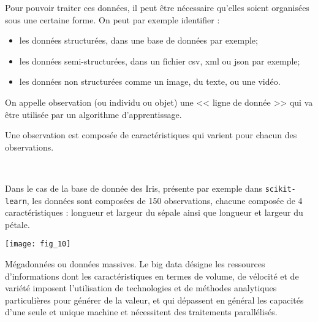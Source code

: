 Pour pouvoir traiter ces données, il peut être nécessaire qu'elles soient organisées sous une certaine forme. On peut par exemple identifier : 
\begin{itemize}
\item les données structurées, dans une base de données par exemple;
\item les données semi-structurées, dans un fichier csv, xml ou json par exemple;
\item les données non structurées comme un image, du texte, ou une vidéo.
\end{itemize}

\begin{defi}

On appelle observation (ou individu ou objet) une << ligne de donnée >> qui va être utilisée par un algorithme d'apprentissage. 

Une observation est composée de caractéristiques qui varient pour chacun des observations. 
\end{defi}

\begin{exemple}~\\

\begin{minipage}[c]{.65\linewidth}
Dans le cas de la base de donnée des Iris, présente par exemple dans \texttt{scikit-learn}, les données sont composées de 150 observations, chacune composée de 4 caractéristiques : longueur et largeur du sépale ainsi que longueur et largeur du pétale.
\end{minipage} \hfill
\begin{minipage}[c]{.3\linewidth}
\begin{center}
\texttt{[image: fig\_10]}
\end{center}
\end{minipage} 

\end{exemple}


\begin{defi}
Mégadonnées ou données massives. Le big data désigne les ressources d’informations dont les caractéristiques en termes de volume, de vélocité et de variété imposent l’utilisation de technologies et de méthodes analytiques particulières pour générer de la valeur, et qui dépassent en général les capacités d'une seule et unique machine et nécessitent des traitements parallélisés.
\end{defi}


